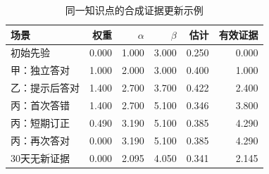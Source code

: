 \begin{table}[H]\centering\caption{同一知识点的合成证据更新示例}\begin{tabularx}{\linewidth}{Yrrrrr}\toprule 场景&权重&$\alpha$&$\beta$&估计&有效证据\\\midrule
初始先验&0.000&1.000&3.000&0.250&0.000\\
甲：独立答对&1.000&2.000&3.000&0.400&1.000\\
乙：提示后答对&1.400&2.700&3.700&0.422&2.400\\
丙：首次答错&1.400&2.700&5.100&0.346&3.800\\
丙：短期订正&0.490&3.190&5.100&0.385&4.290\\
丙：再次答对&0.000&3.190&5.100&0.385&4.290\\
30天无新证据&0.000&2.095&4.050&0.341&2.145\\
\bottomrule\end{tabularx}\end{table}
